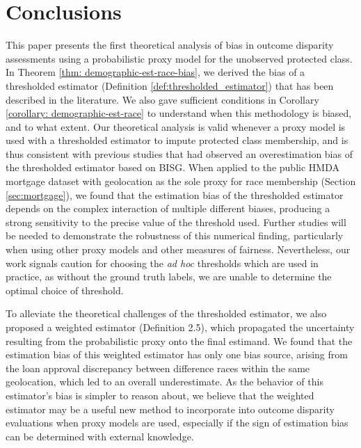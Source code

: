 \section{Conclusions}

This paper presents the first theoretical analysis of bias in outcome disparity assessments using a probabilistic proxy model for the unobserved protected class.
In Theorem \ref{thm: demographic-est-race-bias}, we derived the bias of a thresholded estimator (Definition \ref{def:thresholded_estimator}) that has been described in the literature.
We also gave sufficient conditions in Corollary \ref{corollary: demographic-est-race} to understand when this methodology is biased,
and to what extent.
Our theoretical analysis is valid whenever a proxy model is used with a thresholded estimator to impute protected class membership,
and is thus consistent with previous studies that had observed an overestimation bias of the thresholded estimator based on BISG.
When applied to the public HMDA mortgage dataset with geolocation as the sole proxy for race membership (Section \ref{sec:mortgage}),
we found that the estimation bias of the thresholded estimator depends on the complex interaction of multiple different biases,
producing a strong sensitivity to the precise value of the threshold used.
Further studies will be needed to demonstrate the robustness of this numerical finding,
particularly when using other proxy models and other measures of fairness.
Nevertheless, our work signals caution for choosing the \textit{ad hoc} thresholds which are used in practice,
as without the ground truth labels, we are unable to determine the optimal choice of threshold. 

To alleviate the theoretical challenges of the thresholded estimator, we also proposed a weighted estimator (Definition 2.5),
which propagated the uncertainty resulting from the probabilistic proxy onto the final estimand.
We found that the estimation bias of this weighted estimator has only one bias source,
arising from the loan approval discrepancy between difference races within the same geolocation,
which led to an overall underestimate.
As the behavior of this estimator's bias is simpler to reason about, 
we believe that the weighted estimator may be a useful new method to incorporate into outcome disparity evaluations when proxy models are used,
especially if the sign of estimation bias can be determined with external knowledge.


